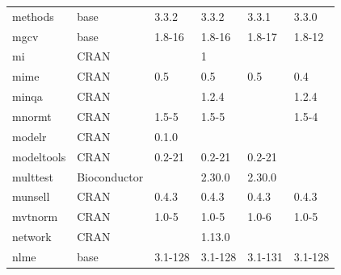 \begin{longtable}{llllll}
\rowcolor{black!5}
methods                       & base                      & 3.3.2       & 3.3.2       & 3.3.1          & 3.3.0              \\
\rowcolor{black!10}
mgcv                          & base                      & 1.8-16      & 1.8-16      & 1.8-17         & 1.8-12            \\
\rowcolor{black!5}
mi                            & \acrshort{CRAN}                      &             & 1           &                &                    \\
\rowcolor{black!10}
mime                          & \acrshort{CRAN}                      & 0.5         & 0.5         & 0.5            & 0.4               \\
\rowcolor{black!5}
minqa                         & \acrshort{CRAN}                      &             & 1.2.4       &                & 1.2.4              \\
\rowcolor{black!10}
mnormt                        & \acrshort{CRAN}                      & 1.5-5       & 1.5-5       &                & 1.5-4             \\
\rowcolor{black!5}
modelr                        & \acrshort{CRAN}                      & 0.1.0       &             &                &                    \\
\rowcolor{black!10}
modeltools                    & \acrshort{CRAN}                      & 0.2-21      & 0.2-21      & 0.2-21         &                   \\
\rowcolor{black!5}
multtest                      & Bioconductor              &             & 2.30.0      & 2.30.0         &                    \\
\rowcolor{black!10}
munsell                       & \acrshort{CRAN}                      & 0.4.3       & 0.4.3       & 0.4.3          & 0.4.3             \\
\rowcolor{black!5}
mvtnorm                       & \acrshort{CRAN}                      & 1.0-5       & 1.0-5       & 1.0-6          & 1.0-5              \\
\rowcolor{black!10}
network                       & \acrshort{CRAN}                      &             & 1.13.0      &                &                   \\
\rowcolor{black!5}
nlme                          & base                      & 3.1-128     & 3.1-128     & 3.1-131        & 3.1-128            \\

\end{longtable}
